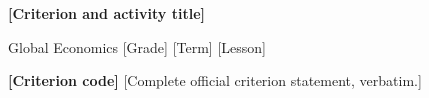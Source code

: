 \newcommand{\criterionbox}[2]{%
    \begin{tcolorbox}[colback=white,colframe=black!45,boxrule=.4pt,
        arc=2mm,boxsep=0pt,left=6pt,right=6pt,top=5pt,bottom=5pt,
        before skip=4pt,after skip=4pt,width=\linewidth]
        \textbf{#1} #2
    \end{tcolorbox}%
}
\newcommand{\problemtitle}[3]{%
    \par\Needspace{4\baselineskip}\addvspace{0.4\baselineskip}%
    \noindent
    {\begin{varwidth}[t]{0.75\linewidth}%
         \bfseries\strut #1. #2%
     \end{varwidth}}%
    \hfill\textbf{#3}\par\nopagebreak[4]
}
\newcommand{\taskheading}[1]{%
    \par\Needspace{5\baselineskip}\addvspace{4pt}%
    \noindent\tikz[baseline=(title.base)]{%
        \node[fill=black!5,draw=none,text=black,rounded corners=2mm,
            inner sep=3pt,outer sep=0pt] (title) {%
            \begin{varwidth}{\dimexpr\linewidth-6pt\relax}%
                \raggedright\bfseries\strut #1\strut
            \end{varwidth}};}\par\nopagebreak[4]\smallskip
}
\newcommand{\task}[2]{\taskheading{#1}#2}
\newcommand{\subtaskheading}[2]{%
    \par\Needspace{4\baselineskip}\addvspace{4pt}%
    \noindent{\color{black}\textbf{\underline{#1. #2.}}}\par
    \nopagebreak[4]\smallskip
}

{\centering
    {\Large\bfseries [Criterion and activity title]\par}
    Global Economics \textbar{} [Grade] \textbar{} [Term] \textbar{} [Lesson]\par
}
\criterionbox{[Criterion code]}{[Complete official criterion statement, verbatim.]}


